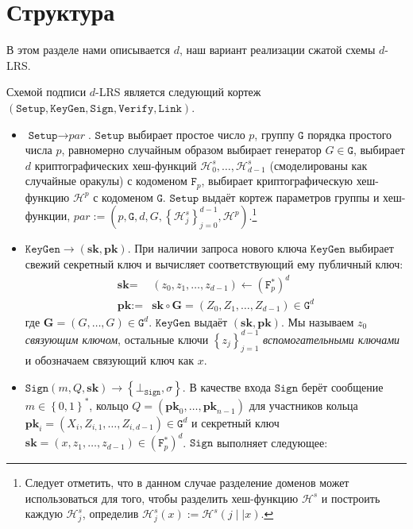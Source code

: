 \documentclass{llncs}
\newcommand{\F}{\texttt{F}_p}
\newcommand{\G}{\texttt{G}}
\newcommand{\Hp}{\mathcal{H}^p}
\newcommand{\Hs}{\mathcal{H}^s}
\begin{document}
\section{Структура}\label{sec:implementation}

В этом разделе нами описывается $d$, наш вариант реализации сжатой схемы $d$-LRS.

\begin{definition}[$d$-CLSAG]\label{def:clsag}
Схемой подписи $d$-LRS является следующий кортеж $(\texttt{Setup}, \texttt{KeyGen}, \texttt{Sign}, \texttt{Verify}, \allowbreak \texttt{Link})$.

\begin{itemize}
\item $\texttt{Setup} \to \textit{par}$. $\texttt{Setup}$ выбирает простое число $p$, группу $\G$ порядка простого числа $p$, равномерно случайным образом выбирает генератор $G \in \G$, выбирает $d$ криптографических хеш-функций $\Hs_0, \ldots, \Hs_{d-1}$ (смоделированы как случайные оракулы) с кодоменом $\F$, выбирает криптографическую хеш-функцию $\Hp$ с кодоменом $\G$. $\texttt{Setup}$ выдаёт кортеж параметров группы и хеш-функции, $\textit{par} := \left(p,\G, d, G, \left\{\Hs_j\right\}_{j=0}^{d-1}, \Hp\right)$.\footnote{Следует отметить, что в данном случае разделение доменов может использоваться для того, чтобы разделить хеш-функцию $\Hs$ и построить каждую $\Hs_j$, определив $\Hs_j(x) := \Hs(j \mid\mid x)$.}

\item $\texttt{KeyGen} \to (\textbf{sk}, \textbf{pk})$. При наличии запроса нового ключа $\texttt{KeyGen}$ выбирает свежий секретный ключ и вычисляет соответствующий ему публичный ключ:
\begin{align*}
\textbf{sk} =& (z_0, z_1, \ldots, z_{d-1}) \leftarrow (\F^*)^d\\
\textbf{pk} :=& \textbf{sk} \circ \textbf{G} = (Z_0, Z_1, \ldots, Z_{d-1}) \in \G^d
\end{align*} где $\textbf{G} = (G, \ldots, G) \in \G^d$. $\texttt{KeyGen}$ выдаёт $(\textbf{sk}, \textbf{pk})$. Мы называем $z_0$ \textit{связующим ключом}, остальные ключи $\left\{z_j\right\}_{j=1}^{d-1}$ \textit{вспомогательными ключами} и обозначаем связующий ключ как $x$.

\item $\texttt{Sign}\left(m, Q, \textbf{sk}\right) \to \left\{\bot_{\texttt{Sign}}, \sigma\right\}$. В качестве входа $\texttt{Sign}$ берёт сообщение $m \in \left\{0,1\right\}^*$, кольцо  $Q = (\textbf{pk}_0, \ldots, \textbf{pk}_{n-1})$ для участников кольца $\textbf{pk}_i = (X_i, Z_{i,1}, \ldots, Z_{i,d-1}) \in \G^d$ и секретный ключ $\textbf{sk} = (x,z_1, \ldots, z_{d-1}) \in (\F^*)^d$. $\texttt{Sign}$ выполняет следующее:


\end{itemize}
\end{definition}
\end{document}
